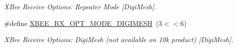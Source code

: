 \begin{DoxyCompactItemize}
\begin{DoxyCompactList}\small\item\em X\+Bee Receive Options\+: Repeater Mode \mbox{[}Digi\+Mesh\mbox{]}. \end{DoxyCompactList}\item 
\mbox{\label{group__xbee__device_ga052c6bbe1695b3cbf9f75fe7bbcaa1d5}} 
\#define \hyperlink{group__xbee__device_ga052c6bbe1695b3cbf9f75fe7bbcaa1d5}{X\+B\+E\+E\+\_\+\+R\+X\+\_\+\+O\+P\+T\+\_\+\+M\+O\+D\+E\+\_\+\+D\+I\+G\+I\+M\+E\+SH}~(3$<$$<$6)
\begin{DoxyCompactList}\small\item\em X\+Bee Receive Options\+: Digi\+Mesh (not available on 10k product) \mbox{[}Digi\+Mesh\mbox{]}. \end{DoxyCompactList}\end{DoxyCompactItemize}
